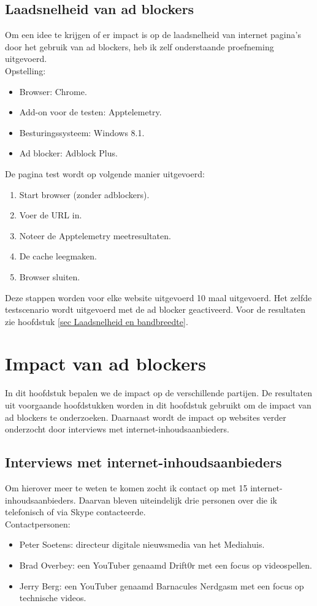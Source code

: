 \documentclass[pdftex,a4paper,12pt,twoside]{report}
\begin{document}
\subsection{Laadsnelheid van ad blockers}
Om een idee te krijgen of er impact is op de laadsnelheid van internet pagina’s door het gebruik van ad blockers, heb ik zelf onderstaande proefneming uitgevoerd.
\\
Opstelling:
\begin{itemize}
	\item Browser: Chrome.
	\item Add-on voor de testen: Apptelemetry.
	\item Besturingssysteem: Windows 8.1.
	\item Ad blocker: Adblock Plus.
\end{itemize}
De pagina test wordt op volgende manier uitgevoerd:
\begin{enumerate}
	\item Start browser (zonder adblockers).
	\item Voer de URL in.
	\item Noteer de Apptelemetry meetresultaten.
	\item De cache leegmaken.
	\item Browser sluiten.
\end{enumerate}

Deze stappen worden voor elke website uitgevoerd 10 maal uitgevoerd. Het zelfde testscenario wordt uitgevoerd met de ad blocker geactiveerd. Voor de resultaten zie hoofdstuk \ref{sec Laadsnelheid en bandbreedte}.

\section{Impact van ad blockers}
In dit hoofdstuk bepalen we de impact op de verschillende partijen. De resultaten uit voorgaande hoofdstukken worden in dit hoofdstuk gebruikt om de impact van ad blockers te onderzoeken. Daarnaast wordt de impact op websites verder onderzocht door interviews met internet-inhoudsaanbieders.
\subsection{Interviews met internet-inhoudsaanbieders}
Om hierover meer te weten te komen zocht ik contact op met 15 internet-inhoudsaanbieders. Daarvan bleven uiteindelijk drie personen over die ik telefonisch of via Skype contacteerde.
\\
Contactpersonen:
\begin{itemize}
	\item Peter Soetens: directeur digitale nieuwsmedia van het Mediahuis.
	\item Brad Overbey: een YouTuber genaamd Drift0r met een focus op videospellen.
	\item Jerry Berg: een YouTuber genaamd Barnacules Nerdgasm met een focus op technische videos.
\end{itemize}
\end{document}
